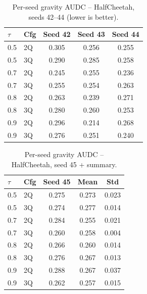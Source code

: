 \documentclass[conference]{IEEEtran}
\begin{document}
\begin{table}[t]
  \centering
  \caption{Per-seed gravity AUDC -- HalfCheetah, seeds 42--44
           (lower is better).}
  \small
  \begin{tabular}{llccc}
    \toprule
    $\tau$ & Cfg & Seed 42 & Seed 43 & Seed 44 \\
    \midrule
    0.5 & 2Q & 0.305 & 0.256 & 0.255 \\
    0.5 & 3Q & 0.290 & 0.285 & 0.258 \\
    0.7 & 2Q & 0.245 & 0.255 & 0.236 \\
    0.7 & 3Q & 0.255 & 0.254 & 0.263 \\
    0.8 & 2Q & 0.263 & 0.239 & 0.271 \\
    0.8 & 3Q & 0.280 & 0.260 & 0.253 \\
    0.9 & 2Q & 0.296 & 0.214 & 0.268 \\
    0.9 & 3Q & 0.276 & 0.251 & 0.240 \\
    \bottomrule
  \end{tabular}
\end{table}

\begin{table}[t]
  \centering
  \caption{Per-seed gravity AUDC -- HalfCheetah, seed 45 + summary.}
  \small
  \begin{tabular}{llccc}
    \toprule
    $\tau$ & Cfg & Seed 45 & Mean & Std \\
    \midrule
    0.5 & 2Q & 0.275 & 0.273 & 0.023 \\
    0.5 & 3Q & 0.274 & 0.277 & 0.014 \\
    0.7 & 2Q & 0.284 & 0.255 & 0.021 \\
    0.7 & 3Q & 0.260 & 0.258 & 0.004 \\
    0.8 & 2Q & 0.266 & 0.260 & 0.014 \\
    0.8 & 3Q & 0.276 & 0.267 & 0.013 \\
    0.9 & 2Q & 0.288 & 0.267 & 0.037 \\
    0.9 & 3Q & 0.262 & 0.257 & 0.015 \\
    \bottomrule
  \end{tabular}
\end{table}
\end{document}
